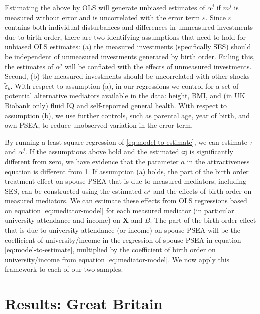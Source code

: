 \documentclass[
  12pt,
]{article}
\theoremstyle{definition}
\theoremstyle{definition}
\theoremstyle{definition}
\theoremstyle{definition}
\theoremstyle{remark}
\begin{document}
Estimating the above by OLS will generate unbiased estimates of
\(\alpha^j\) if \(m^j\) is measured without error and is uncorrelated with
the error term \(\varepsilon\). Since \(\varepsilon\) contains both
individual disturbances and differences in unmeasured investments due to
birth order, there are two identifying assumptions that need to hold for
unbiased OLS estimates: (a) the measured investments (specifically SES)
should be independent of unmeasured investments generated by birth
order. Failing this, the estimates of \(\alpha^j\) will be conflated with
the effects of unmeasured investments. Second, (b) the measured
investments should be uncorrelated with other shocks
\(\tilde{\varepsilon}_b\). With respect to assumption (a), in our
regressions we control for a set of potential alternative mediators
available in the data: height, BMI, and (in UK Biobank only) fluid IQ
and self-reported general health. With respect to assumption (b), we use
further controls, such as parental age, year of birth, and own PSEA, to
reduce unobserved variation in the error term.

By running a least square regression of \eqref{eq:model-to-estimate}, we
can estimate \(\tau\) and \(\alpha^j\). If the assumptions above hold and
the estimated αj is significantly different from zero, we have evidence
that the parameter \(a\) in the attractiveness equation is different
from 1. If assumption (a) holds, the part of the birth order treatment
effect on spouse PSEA that is due to measured mediators, including SES,
can be constructed using the estimated \(\alpha^j\) and the effects of
birth order on measured mediators. We can estimate these effects from
OLS regressions based on equation \eqref{eq:mediator-model} for each
measured mediator (in particular university attendance and income) on
\(\mathbf{X}\) and \(B\). The part of the birth order effect that is due to
university attendance (or income) on spouse PSEA will be the coefficient
of university/income in the regression of spouse PSEA in equation
\eqref{eq:model-to-estimate}, multiplied by the coefficient of birth
order on university/income from equation \eqref{eq:mediator-model}. We
now apply this framework to each of our two samples.

\section{Results: Great Britain}\label{results-great-britain}

 
  \providecommand{\huxb}[2]{\arrayrulecolor[RGB]{#1}\global\arrayrulewidth=#2pt}
  \providecommand{\huxvb}[2]{\color[RGB]{#1}\vrule width #2pt}
  \providecommand{\huxtpad}[1]{\rule{0pt}{#1}}
  \providecommand{\huxbpad}[1]{\rule[-#1]{0pt}{#1}}
\end{document}

